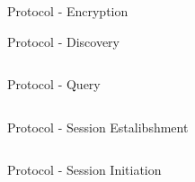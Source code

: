 \documentclass[a4paper]{beamer}
\begin{document}
\begin{frame}{Protocol - Encryption}
\end{frame}

\begin{frame}{Protocol - Discovery}
    \begin{columns}[t]
        \begin{column}{0.44\textwidth}
            
        \end{column}
        \begin{column}{0.44\textwidth}
            
        \end{column}
    \end{columns}
\end{frame}

\begin{frame}{Protocol - Query}
    \begin{columns}[t]
        \begin{column}{0.44\textwidth}
        \end{column}
        \begin{column}{0.44\textwidth}
            
        \end{column}
    \end{columns}
\end{frame}

\begin{frame}{Protocol - Session Estalibshment}
    \begin{columns}[t]
        \begin{column}{0.48\textwidth}
            
        \end{column}
        \begin{column}{0.40\textwidth}
            
        \end{column}
    \end{columns}
\end{frame}

\begin{frame}{Protocol - Session Initiation}
    \begin{columns}[t]
        \begin{column}{0.44\textwidth}
            
        \end{column}
        \begin{column}{0.44\textwidth}
        \end{column}
    \end{columns}
\end{frame}
\end{document}
